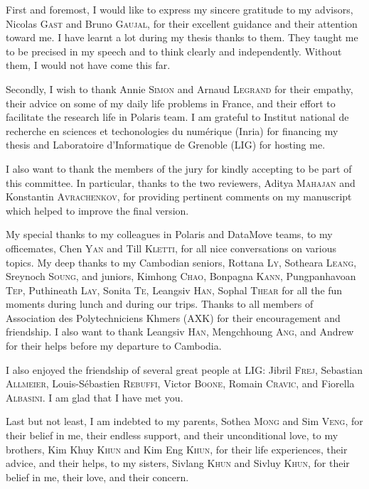

\vspace*{-5mm}
First and foremost, I would like to express my sincere gratitude to my advisors, Nicolas \textsc{Gast} and Bruno \textsc{Gaujal}, for their excellent guidance and their attention toward me.
I have learnt a lot during my thesis thanks to them.
They taught me to be precised in my speech and to think clearly and independently.
Without them, I would not have come this far.

Secondly, I wish to thank Annie \textsc{Simon} and Arnaud \textsc{Legrand} for their empathy, their advice on some of my daily life problems in France, and their effort to facilitate the research life in Polaris team. I am grateful to Institut national de recherche en sciences et techonologies du numérique (Inria) for financing my thesis and Laboratoire d'Informatique de Grenoble (LIG) for hosting me.

I also want to thank the members of the jury for kindly accepting to be part of this committee.
In particular, thanks to the two reviewers, Aditya \textsc{Mahajan} and Konstantin \textsc{Avrachenkov}, for providing pertinent comments on my manuscript which helped to improve the final version.

My special thanks to my colleagues in Polaris and DataMove teams, to my officemates, Chen \textsc{Yan} and Till \textsc{Kletti}, for all nice conversations on various topics.
My deep thanks to my Cambodian seniors, Rottana \textsc{Ly}, Sotheara \textsc{Leang}, Sreynoch \textsc{Soung}, and juniors, Kimhong \textsc{Chao}, Bonpagna \textsc{Kann}, Pungpanhavoan \textsc{Tep}, Puthineath \textsc{Lay}, Sonita \textsc{Te}, Leangsiv \textsc{Han}, Sophal \textsc{Thear} for all the fun moments during lunch and during our trips.
Thanks to all members of Association des Polytechniciens Khmers (AXK) for their encouragement and friendship.
I also want to thank Leangsiv \textsc{Han}, Mengchhoung \textsc{Ang}, and Andrew for their helps before my departure to Cambodia.

I also enjoyed the friendship of several great people at LIG: Jibril \textsc{Frej}, Sebastian \textsc{Allmeier}, Louis-Sébastien \textsc{Rebuffi}, Victor \textsc{Boone}, Romain \textsc{Cravic}, and Fiorella \textsc{Albasini}.
I am glad that I have met you.

Last but not least, I am indebted to my parents, Sothea \textsc{Mong} and Sim \textsc{Veng}, for their belief in me, their endless support, and their unconditional love, to my brothers, Kim Khuy \textsc{Khun} and Kim Eng \textsc{Khun}, for their life experiences, their advice, and their helps, to my sisters, Sivlang \textsc{Khun} and Sivluy \textsc{Khun}, for their belief in me, their love, and their concern.

%
%
